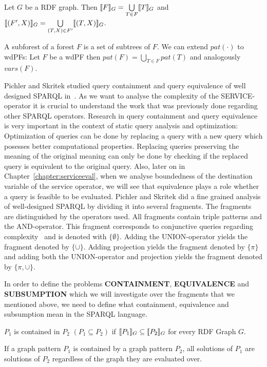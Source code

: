 \begin{definition}
Let $G$ be a RDF graph. 
Then $\llbracket F \rrbracket_G = \bigcup\limits_{T\in F}\llbracket T \rrbracket_G$ and $\llbracket(F',X)\rrbracket_G =
\bigcup\limits_{(T,X) \in F'} \llbracket (T,X) \rrbracket_G$. 
\end{definition}


A subforest of a forest $F$ is a set of subtrees of $F$.
We can extend $pat(\cdot)$ to wdPFs: Let $F$ be a wdPF then $pat(F) =
\bigcup\limits_{T \in F}  pat(T)$ and analogously $vars(F)$.

Pichler and Skritek studied query containment and query equivalence of well
designed SPARQL in~\cite{pichler2014containment}. As we want to analyse the
complexity of the SERVICE-operator it is crucial to understand the work that was previously done regarding other
SPARQL operators.
Research in query containment and query equivalence is very important in the
context of static query analysis and optimization: Optimization of queries can
be done by replacing a query with a new query which posesses better computational properties. 
Replacing queries
preserving the meaning of the original meaning can only be done by checking if
the replaced query is equivalent to the original query. Also, later on in
Chapter~\ref{chapter:serviceeval}, when we analyse
boundedness of the destination variable of the service operator, we will see
that equivalence plays a role whether a query is feasible to be
evaluated. 
Pichler and Skritek did a fine grained analysis of well-designed SPARQL by
dividing it into several fragments. The fragments are distinguished by
the operators used. All fragments contain triple patterns and the AND-operator. This
fragment corresponds to conjunctive queries regarding complexity~\cite{letelier2013static} 
and is denoted with $\{\emptyset\}$. Adding the UNION-operator yields the fragment 
denoted by $\{\cup\}$. Adding projection yields the fragment denoted by $\{\pi\}$ 
and adding both the UNION-operator and projection yields the fragment denoted by $\{\pi,\cup\}$.

In order to define the problems \textbf{CONTAINMENT}, \textbf{EQUIVALENCE} and
\textbf{SUBSUMPTION} which we will investigate over the fragments that we
mentioned above, we need to define what containment, equivalence and subsumption mean
in the SPARQL language.
\begin{definition}[Containment]
\medskip\noindent $P_1$ is contained in $P_2$ $(P_1 \subseteq P_2)$ 
if $\llbracket P_1 \rrbracket_G \subseteq
\llbracket P_2 \rrbracket_G$ for every RDF Graph $G$.
\end{definition}
If a graph pattern $P_1$ is contained by a graph pattern $P_2$, all
solutions of $P_1$ are solutions of $P_2$ regardless of the graph
they are evaluated over.


